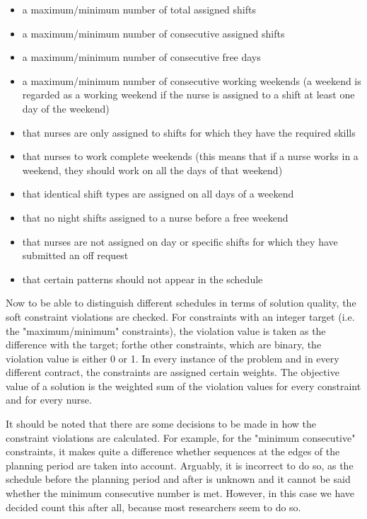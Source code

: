 \documentclass{article}
\begin{document}
\begin{itemize}
	\item a maximum/minimum number of total assigned shifts
	\item a maximum/minimum number of consecutive assigned shifts
	\item a maximum/minimum number of consecutive free days 
	\item a maximum/minimum number of consecutive working weekends
		(a weekend is regarded as a working weekend if the nurse is assigned to a shift at least one day of the weekend)
	\item that nurses are only assigned to shifts for which they have the required skills
	\item that nurses to work complete weekends
		(this means that if a nurse works in a weekend, they should work on all the days of that weekend)
	\item that identical shift types are assigned on all days of a weekend
	\item that no night shifts assigned to a nurse before a free weekend
	\item that nurses are not assigned on day or specific shifts for which they have submitted an off request
	\item that certain patterns should not appear in the schedule
\end{itemize}

Now to be able to distinguish different schedules in terms of solution quality, the soft constraint violations are checked.
For constraints with an integer target (i.e. the "maximum/minimum" constraints), the violation value is taken as the difference with the target; forthe other constraints, which are binary, the violation value is either 0 or 1.
In every instance of the problem and in every different contract, the constraints are assigned certain weights.
The objective value of a solution is the weighted sum of the violation values for every constraint and for every nurse.

It should be noted that there are some decisions to be made in how the constraint violations are calculated.
For example, for the "minimum consecutive" constraints, it makes quite a difference whether sequences at the edges of the planning period are taken into account.
Arguably, it is incorrect to do so, as the schedule before the planning period and after is unknown and it cannot be said whether the minimum consecutive number is met.
However, in this case we have decided count this after all, because most researchers seem to do so.
\end{document}
